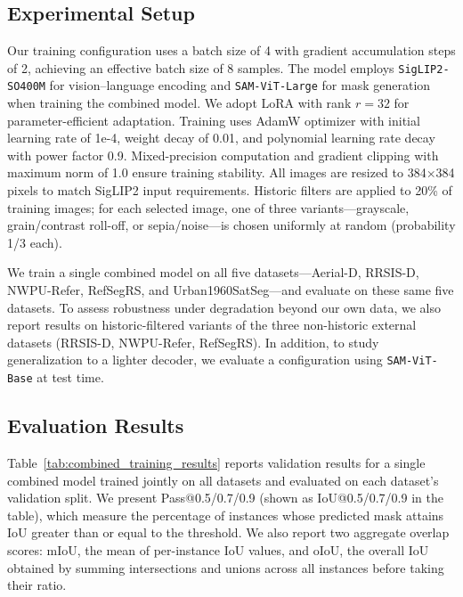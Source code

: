 \subsection{Experimental Setup}
\label{subsec:experimental_setup}

Our training configuration uses a batch size of 4 with gradient accumulation steps of 2, achieving an effective batch size of 8 samples. The model employs \texttt{SigLIP2-SO400M} for vision–language encoding and \texttt{SAM-ViT-Large} for mask generation when training the combined model. We adopt LoRA with rank \(r=32\) for parameter-efficient adaptation. Training uses AdamW optimizer\cite{adamw} with initial learning rate of 1e-4, weight decay of 0.01, and polynomial learning rate decay with power factor 0.9. Mixed-precision computation and gradient clipping with maximum norm of 1.0 ensure training stability. All images are resized to 384×384 pixels to match SigLIP2 input requirements. Historic filters are applied to 20\% of training images; for each selected image, one of three variants—grayscale, grain/contrast roll-off, or sepia/noise—is chosen uniformly at random (probability 1/3 each).

We train a single combined model on all five datasets—Aerial-D, RRSIS-D\cite{liu2024rotated}, NWPU-Refer\cite{yang2024large}, RefSegRS\cite{yuan2023rrsis}, and Urban1960SatSeg\cite{hao2025urban1960satseg}—and evaluate on these same five datasets. To assess robustness under degradation beyond our own data, we also report results on historic-filtered variants of the three non-historic external datasets (RRSIS-D, NWPU-Refer, RefSegRS). In addition, to study generalization to a lighter decoder, we evaluate a configuration using \texttt{SAM-ViT-Base} at test time.

\subsection{Evaluation Results}
\label{subsec:evaluation_results}

Table~\ref{tab:combined_training_results} reports validation results for a single combined model trained jointly on all datasets and evaluated on each dataset's validation split. We present Pass@0.5/0.7/0.9 (shown as IoU@0.5/0.7/0.9 in the table), which measure the percentage of instances whose predicted mask attains IoU greater than or equal to the threshold. We also report two aggregate overlap scores: mIoU, the mean of per-instance IoU values, and oIoU, the overall IoU obtained by summing intersections and unions across all instances before taking their ratio.

